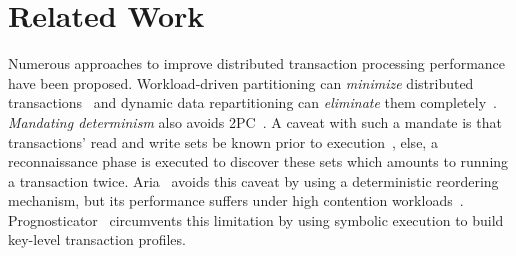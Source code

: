 \section{Related Work}
\label{sec:related-work}

Numerous approaches to improve distributed transaction processing performance have been proposed.
Workload-driven partitioning can \emph{minimize} distributed transactions~\cite{curino} and dynamic data repartitioning can \emph{eliminate} them completely~\cite{das,lin}.
\emph{Mandating determinism} also avoids 2PC~\cite{thomson,ren,thomson2}.
A caveat with such a mandate is that 
transactions' read and write sets be known prior 
to execution~\cite{ren2},
else, a reconnaissance phase is executed to
discover these sets which amounts to running a transaction twice. 
Aria~\cite{lu2} avoids this caveat by using a deterministic reordering mechanism, but its performance suffers under high contention workloads~\cite{lu}.
Prognosticator~\cite{issa} circumvents this limitation by using symbolic execution to build key-level 
transaction profiles.

